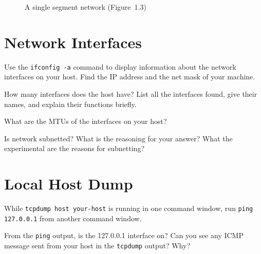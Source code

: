 \documentclass{../UTNetLab}
\begin{document}
\begin{center}
\begin{minipage}{0.48\textwidth}
\begin{flushright}
\begin{figure}[H]
                    \caption{A single segment network (Figure~1.3)}\label{fig:1.3}
                \end{figure}
            \end{flushright}
        \end{minipage}
    \end{center}

\section{Network Interfaces}
    Use the \lstinline{ifconfig -a} command to display information about the network interfaces on your host.
    Find the IP address and the net mask of your machine.
    
    \begin{report}
    \item How many interfaces does the host have?
    List all the interfaces found, give their names, and explain their functions briefly.

    \item What are the MTUs of the interfaces on your host?

    \item Is network subnetted?
    What is the reasoning for your answer? What the experimental are the reasons for subnetting?
    \end{report}


\section{Local Host Dump}
    While \lstinline[emph={your-host}]{tcpdump host your-host} is running in one command window, run \lstinline{ping 127.0.0.1} from another command window.
    
    \begin{report}
    \item From the \lstinline{ping} output, is the 127.0.0.1 interface on?
    Can you see any ICMP message sent from your host in the \lstinline{tcpdump} output?
    Why?
    \end{report}
\end{document}
